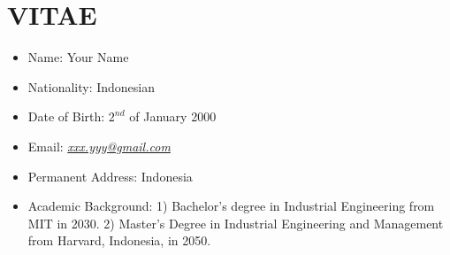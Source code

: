 \newpage
{} %
\label{vitae}

\chapter*{\centering VITAE}


\begin{itemize}
  \item Name\hspace{3.11cm}: Your Name  		
  \item Nationality\hspace{2.12cm}: Indonesian	
  \item Date of Birth\hspace{1.72cm}: $2^{nd}$ of January 2000
  \item Email\hspace{3.08cm}: \emph{\href{mailto:xxx.yyy@gmail.com}{xxx.yyy@gmail.com}}
  \item Permanent Address\hspace{0.62cm}: Indonesia
  \item Academic Background\hspace{0.1cm}: 1) Bachelor's degree in Industrial Engineering from MIT in 2030. 2) Master's Degree in Industrial Engineering and Management from Harvard, Indonesia, in 2050.
\end{itemize}

